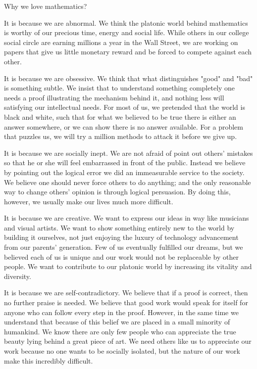 \documentclass{article}
\begin{document}
Why we love mathematics?

It is because we are abnormal. We think the platonic world behind mathematics is worthy of our precious time, energy and social life. While others in our college social circle are earning millions a year in the Wall Street, we are working on papers that give us little monetary reward and be forced to compete against each other. 

It is because we are obsessive. We think that what distinguishes "good" and "bad" is something subtle. We insist that to understand something completely one needs a proof illustrating the mechanism behind it, and nothing less will satisfying our intellectual needs. For most of us, we pretended that the world is black and white, such that for what we believed to be true there is either an answer somewhere, or we can show there is no answer available. For a problem that puzzles us, we will try a million methods to attack it before we give up. 

It is because we are socially inept. We are not afraid of point out others' mistakes so that he or she will feel embarrassed in front of the public. Instead we believe by pointing out the logical error we did an immeasurable service to the society. We believe one should never force others to do anything; and the only reasonable way to change others' opinion is through logical persuasion. By doing this, however, we usually make our lives much more difficult. 

It is because we are creative. We want to express our ideas in way like musicians and visual artists. We want to show something entirely new to the world by building it ourselves, not just enjoying the luxury of technology advancement from our parents' generation. Few of us eventually fulfilled our dreams, but we believed each of us is unique and our work would not be replaceable by other people. We want to contribute to our platonic world by increasing its vitality and diversity. 

It is because we are self-contradictory. We believe that if a proof is correct, then no further praise is needed. We believe that good work would speak for itself for anyone who can follow every step in the proof. However, in the same time we understand that because of this belief we are placed in a small minority of humankind. We know there are only few people who can appreciate the true beauty lying behind a great piece of art. We need others like us to appreciate our work because no one wants to be socially isolated, but the nature of our work make this incredibly difficult. 
\end{document}
